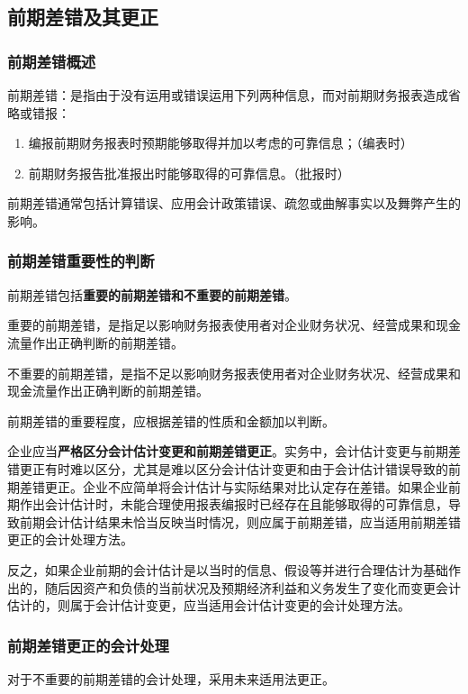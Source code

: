 \documentclass[UTF8,12pt]{ctexart}
\numberwithin{equation}{section} %
\numberwithin{figure}{section}
\numberwithin{table}{section}
\begin{document}
	\subsection{前期差错及其更正}
	\subsubsection{前期差错概述}
	前期差错：是指由于没有运用或错误运用下列两种信息，而对前期财务报表造成省略或错报：
	\begin{enumerate}
		\item 编报前期财务报表时预期能够取得并加以考虑的可靠信息；（编表时）
		
		\item 前期财务报告批准报出时能够取得的可靠信息。（批报时）
	\end{enumerate}
	
	前期差错通常包括计算错误、应用会计政策错误、疏忽或曲解事实以及舞弊产生的影响。
	
	\subsubsection{前期差错重要性的判断}
	前期差错包括\textbf{重要的前期差错和不重要的前期差错}。
	
	重要的前期差错，是指足以影响财务报表使用者对企业财务状况、经营成果和现金流量作出正确判断的前期差错。
	
	不重要的前期差错，是指不足以影响财务报表使用者对企业财务状况、经营成果和现金流量作出正确判断的前期差错。
	
	前期差错的重要程度，应根据差错的性质和金额加以判断。
	
	企业应当\textbf{严格区分会计估计变更和前期差错更正}。实务中，会计估计变更与前期差错更正有时难以区分，尤其是难以区分会计估计变更和由于会计估计错误导致的前期差错更正。企业不应简单将会计估计与实际结果对比认定存在差错。如果企业前期作出会计估计时，未能合理使用报表编报时已经存在且能够取得的可靠信息，导致前期会计估计结果未恰当反映当时情况，则应属于前期差错，应当适用前期差错更正的会计处理方法。
	
	反之，如果企业前期的会计估计是以当时的信息、假设等并进行合理估计为基础作出的，随后因资产和负债的当前状况及预期经济利益和义务发生了变化而变更会计估计的，则属于会计估计变更，应当适用会计估计变更的会计处理方法。
	
	\subsubsection{前期差错更正的会计处理}
	对于不重要的前期差错的会计处理，采用未来适用法更正。
	
\end{document}
